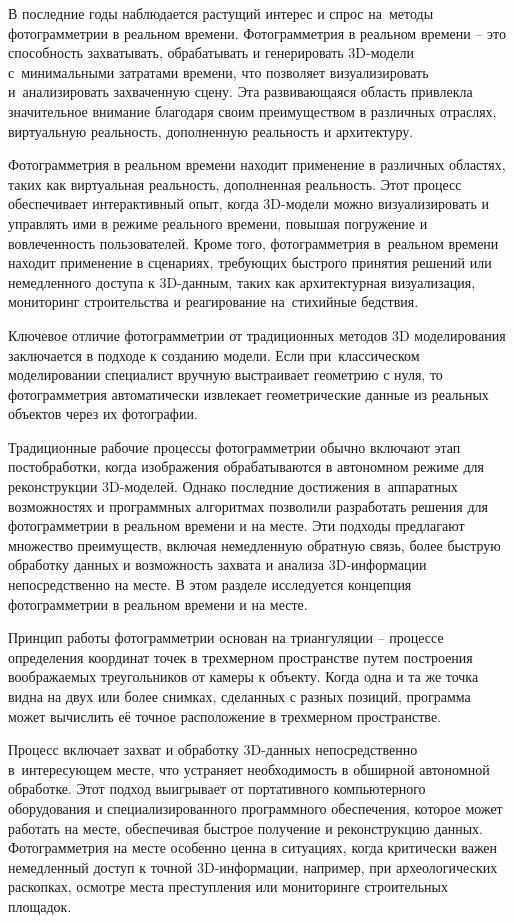 \documentclass{ou}
\begin{document}
В последние годы наблюдается растущий интерес и спрос на~методы фотограмметрии в реальном времени. Фотограмметрия в реальном времени -- это способность захватывать, обрабатывать и генерировать 3D-модели с~минимальными затратами времени, что позволяет визуализировать и~анализировать захваченную сцену. Эта развивающаяся область привлекла значительное внимание благодаря своим преимуществом в различных отраслях, виртуальную реальность, дополненную реальность и архитектуру.

Фотограмметрия в реальном времени находит применение в различных областях, таких как виртуальная реальность, дополненная реальность. Этот процесс обеспечивает интерактивный опыт, когда 3D-модели можно визуализировать и управлять ими в режиме реального времени, повышая погружение и вовлеченность пользователей. Кроме того, фотограмметрия в~реальном времени находит применение в сценариях, требующих быстрого принятия решений или немедленного доступа к 3D-данным, таких как архитектурная визуализация, мониторинг строительства и реагирование на~стихийные бедствия.

Ключевое отличие фотограмметрии от традиционных методов 3D моделирования заключается в подходе к созданию модели. Если при~классическом моделировании специалист вручную выстраивает геометрию с нуля, то фотограмметрия автоматически извлекает геометрические данные из реальных объектов через их фотографии\cite{incredibleart}.

Традиционные рабочие процессы фотограмметрии обычно включают этап постобработки, когда изображения обрабатываются в автономном режиме для реконструкции 3D-моделей. Однако последние достижения в~аппаратных возможностях и программных алгоритмах позволили разработать решения для фотограмметрии в реальном времени и на месте. Эти подходы предлагают множество преимуществ, включая немедленную обратную связь, более быструю обработку данных и возможность захвата и анализа 3D-информации непосредственно на месте. В этом разделе исследуется концепция фотограмметрии в реальном времени и на месте\cite{skillbox_fotogrammetriya}.

Принцип работы фотограмметрии основан на триангуляции -- процессе определения координат точек в трехмерном пространстве путем построения воображаемых треугольников от камеры к объекту. Когда одна и та же точка видна на двух или более снимках, сделанных с разных позиций, программа может вычислить её точное расположение в трехмерном пространстве.

Процесс включает захват и обработку 3D-данных непосредственно в~интересующем месте, что устраняет необходимость в обширной автономной обработке. Этот подход выигрывает от портативного компьютерного оборудования и специализированного программного обеспечения, которое может работать на месте, обеспечивая быстрое получение и реконструкцию данных. Фотограмметрия на месте особенно ценна в ситуациях, когда критически важен немедленный доступ к точной 3D-информации, например, при археологических раскопках, осмотре места преступления или мониторинге строительных площадок\cite{incredibleart}.
\end{document}
